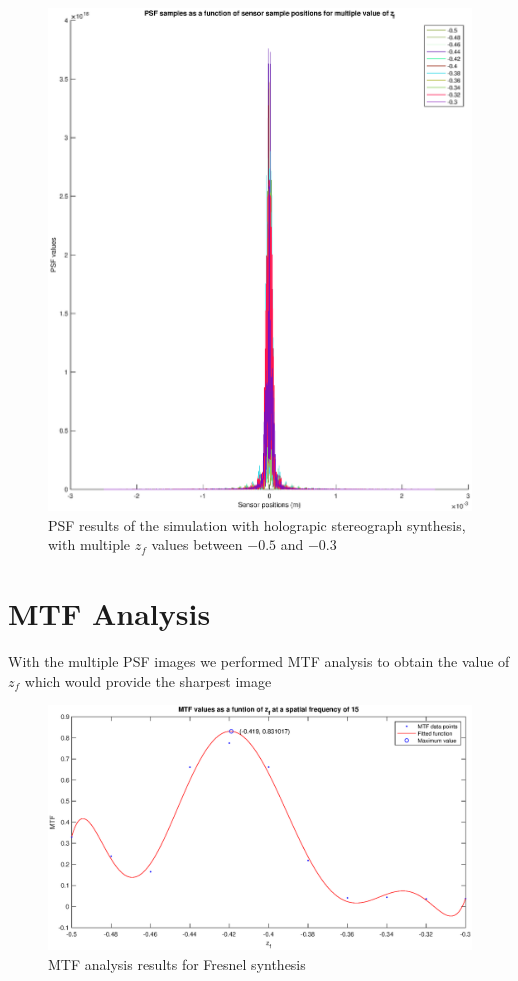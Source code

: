 \documentclass[12pt,a4paper,english
]{tunithesis}
\begin{document}
\begin{figure}
  \label{fig:psf_multiple_hs}
  \centering
  \includegraphics[width=\columnwidth]{img/psf_multiple_hs.eps}
  \caption{PSF results of the simulation with holograpic stereograph synthesis, with multiple $z_f$ values between $-0.5$ and $-0.3$}
\end{figure}


\section{MTF Analysis}
With the multiple PSF images we performed MTF analysis to obtain the value of $z_f$ which would provide the sharpest image

\begin{figure}
  \label{fig:mtf_fresnel}
  \centering
  \includegraphics[width=\columnwidth]{img/mtf_fresnel.eps}
  \caption{MTF analysis results for Fresnel synthesis}
\end{figure}
\end{document}
